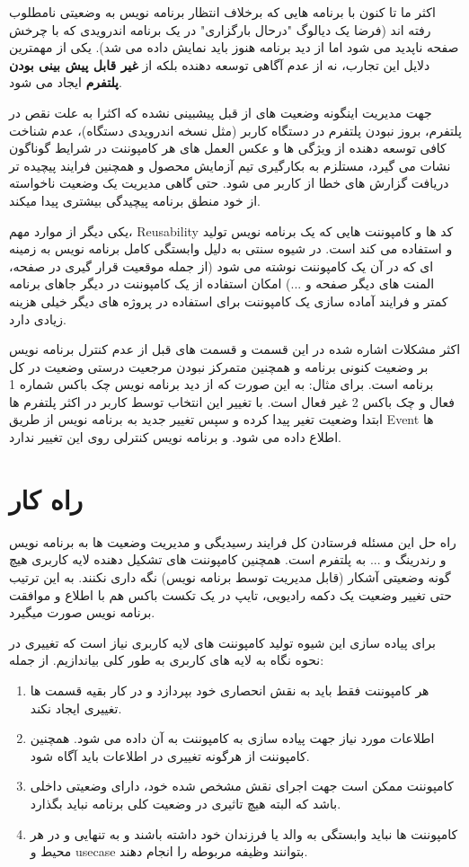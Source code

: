 \documentclass{CSICC2020}
\begin{document}
اکثر ما تا کنون با برنامه هایی که برخلاف انتظار برنامه نویس به وضعیتی نامطلوب رفته اند (فرضا یک دیالوگ "درحال بارگزاری" در یک برنامه اندرویدی که با چرخش صفحه ناپدید می شود اما از دید برنامه هنوز باید نمایش داده می شد). یکی از مهمترین دلایل این تجارب، نه از عدم آگاهی توسعه دهنده بلکه از {\bf غیر قابل پیش بینی بودن پلتفرم} ایجاد می شود.

جهت مدیریت اینگونه وضعیت های از قبل پیشبینی نشده که اکثرا به علت نقص در پلتفرم، بروز نبودن پلتفرم در دستگاه کاربر (مثل نسخه اندرویدی دستگاه)، عدم شناخت کافی توسعه دهنده از ویژگی ها و عکس العمل های هر کامپوننت در شرایط گوناگون نشات می گیرد، مستلزم به بکارگیری تیم آزمایش محصول و همچنین فرایند پیچیده تر دریافت گزارش های خطا از کاربر می شود. 
حتی گاهی مدیریت یک وضعیت ناخواسته از خود منطق برنامه پیچیدگی بیشتری پیدا میکند.

یکی دیگر از موارد مهم، Reusability کد ها و کامپوننت هایی که یک برنامه نویس تولید و استفاده می کند است. در شیوه سنتی به دلیل وابستگی کامل برنامه نویس به زمینه ای که در آن یک کامپوننت نوشته می شود (از جمله موقعیت قرار گیری در صفحه، المنت های دیگر صفحه و ...) امکان استفاده از یک کامپوننت در دیگر جاهای برنامه کمتر و فرایند آماده سازی یک کامپوننت برای استفاده در پروژه های دیگر خیلی هزینه زیادی دارد.

اکثر مشکلات اشاره شده در این قسمت و قسمت های قبل از عدم کنترل برنامه نویس بر وضعیت کنونی برنامه و همچنین متمرکز نبودن مرجعیت درستی وضعیت در کل برنامه است. 
برای مثال: به این صورت که از دید برنامه نویس چک باکس شماره 1 فعال و چک باکس 2 غیر فعال است. با تغییر این انتخاب توسط کاربر در اکثر پلتفرم ها ابتدا وضعیت تغیر پیدا کرده و سپس تغییر جدید به برنامه نویس از طریق Event ها اطلاع داده می شود. و برنامه نویس کنترلی روی این تغییر ندارد.

\section{راه کار}

راه حل این مسئله فرستادن کل فرایند رسیدیگی و مدیریت وضعیت ها به برنامه نویس و رندرینگ و ... به پلتفرم است.
همچنین کامپوننت های تشکیل دهنده لایه کاربری هیچ گونه وضعیتی آشکار (قابل مدیریت توسط برنامه نویس) نگه داری نکنند. به این ترتیب حتی تغییر وضعیت یک دکمه رادیویی، تایپ در یک تکست باکس هم با اطلاع و موافقت برنامه نویس صورت میگیرد.

برای پیاده سازی این شیوه تولید کامپوننت های لایه کاربری نیاز است که تغییری در نحوه نگاه به لایه های کاربری به طور کلی بیاندازیم. از جمله:

\begin{enumerate} 
\item هر کامپوننت فقط باید به نقش انحصاری خود بپردازد و در کار بقیه قسمت ها تغییری ایجاد نکند.
\item اطلاعات مورد نیاز جهت پیاده سازی به کامپوننت به آن داده می شود. همچنین کامپوننت از هرگونه تغییری در اطلاعات باید آگاه شود.
\item کامپوننت ممکن است جهت اجرای نقش مشخص شده خود، دارای وضعیتی داخلی باشد که البته هیچ تاثیری در وضعیت کلی برنامه نباید بگذارد.
\item کامپوننت ها نباید وابستگی به والد یا فرزندان خود داشته باشند و به تنهایی و در هر محیط و usecase بتوانند وظیفه مربوطه را انجام دهند.
\end{enumerate}
\end{document}
